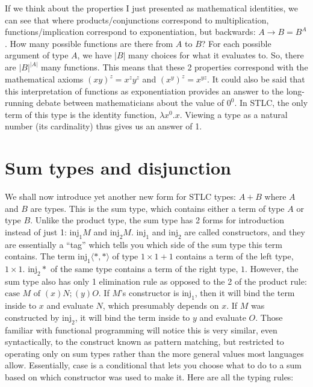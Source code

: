 \documentclass[12pt]{article}
\begin{document}
If we think about the properties I just presented as mathematical identities, we can see that where products/conjunctions correspond to multiplication, functions/implication correspond to exponentiation, but backwards: $A \to B = B^A$. How many possible functions are there from $A$ to $B$? For each possible argument of type $A$, we have $|B|$ many choices for what it evaluates to. So, there are $|B|^{|A|}$ many functions. This means that these 2 properties correspond with the mathematical axioms $(xy)^z = x^zy^z$ and $(x^y)^z = x^{yz}$. It could also be said that this interpretation of functions as exponentiation provides an answer to the long-running debate between mathematicians about the value of $0^0$. In STLC, the only term of this type is the identity function, $\lambda x^0. x$. Viewing a type as a natural number (its cardinality) thus gives us an answer of 1.

\section{Sum types and disjunction}

We shall now introduce yet another new form for STLC types: $A + B$ where $A$ and $B$ are types. This is the sum type, which contains either a term of type $A$ or type $B$. Unlike the product type, the sum type has 2 forms for introduction instead of just 1: $\text{inj}_1M$ and $\text{inj}_2M$. $\text{inj}_1$ and $\text{inj}_2$ are called constructors, and they are essentially a ``tag'' which tells you which side of the sum type this term contains. The term $\text{inj}_1 \langle *, * \rangle$ of type $1 \times 1 + 1$ contains a term of the left type, $1 \times 1$. $\text{inj}_2 *$ of the same type contains a term of the right type, $1$. However, the sum type also has only 1 elimination rule as opposed to the 2 of the product rule: $\text{case } M \text{ of } (x)N; (y)O$. If $M$'s constructor is $\text{inj}_1$, then it will bind the term inside to $x$ and evaluate $N$, which presumably depends on $x$. If $M$ was constructed by $\text{inj}_2$, it will bind the term inside to $y$ and evaluate $O$. Those familiar with functional programming will notice this is very similar, even syntactically, to the construct known as pattern matching, but restricted to operating only on sum types rather than the more general values most languages allow. Essentially, case is a conditional that lets you choose what to do to a sum based on which constructor was used to make it. Here are all the typing rules:
\end{document}
